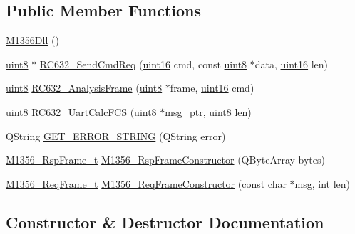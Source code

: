 \subsection*{Public Member Functions}
\begin{DoxyCompactItemize}
\item 
\mbox{\hyperlink{class_m1356_dll_a38686d41a3476f15cf676795806aff7d}{M1356\+Dll}} ()
\item 
\mbox{\hyperlink{m1356dll_8h_adde6aaee8457bee49c2a92621fe22b79}{uint8}} $\ast$ \mbox{\hyperlink{class_m1356_dll_ab86ae59233d587f4688470796cbb85b1}{R\+C632\+\_\+\+Send\+Cmd\+Req}} (\mbox{\hyperlink{m1356dll_8h_a05f6b0ae8f6a6e135b0e290c25fe0e4e}{uint16}} cmd, const \mbox{\hyperlink{m1356dll_8h_adde6aaee8457bee49c2a92621fe22b79}{uint8}} $\ast$data, \mbox{\hyperlink{m1356dll_8h_a05f6b0ae8f6a6e135b0e290c25fe0e4e}{uint16}} len)
\item 
\mbox{\hyperlink{m1356dll_8h_adde6aaee8457bee49c2a92621fe22b79}{uint8}} \mbox{\hyperlink{class_m1356_dll_a40aed3801baa294bf828c5ab794ef82e}{R\+C632\+\_\+\+Analysis\+Frame}} (\mbox{\hyperlink{m1356dll_8h_adde6aaee8457bee49c2a92621fe22b79}{uint8}} $\ast$frame, \mbox{\hyperlink{m1356dll_8h_a05f6b0ae8f6a6e135b0e290c25fe0e4e}{uint16}} cmd)
\item 
\mbox{\hyperlink{m1356dll_8h_adde6aaee8457bee49c2a92621fe22b79}{uint8}} \mbox{\hyperlink{class_m1356_dll_a048d48e3154a48258d25391b19de938c}{R\+C632\+\_\+\+Uart\+Calc\+F\+CS}} (\mbox{\hyperlink{m1356dll_8h_adde6aaee8457bee49c2a92621fe22b79}{uint8}} $\ast$msg\+\_\+ptr, \mbox{\hyperlink{m1356dll_8h_adde6aaee8457bee49c2a92621fe22b79}{uint8}} len)
\item 
Q\+String \mbox{\hyperlink{class_m1356_dll_ad35a73433e99eb6ccce5f3729f7ae283}{G\+E\+T\+\_\+\+E\+R\+R\+O\+R\+\_\+\+S\+T\+R\+I\+NG}} (Q\+String error)
\item 
\mbox{\hyperlink{struct_m1356___rsp_frame__t}{M1356\+\_\+\+Rsp\+Frame\+\_\+t}} \mbox{\hyperlink{class_m1356_dll_a40131e8263bd201208a37ec1826d5310}{M1356\+\_\+\+Rsp\+Frame\+Constructor}} (Q\+Byte\+Array bytes)
\item 
\mbox{\hyperlink{struct_m1356___req_frame__t}{M1356\+\_\+\+Req\+Frame\+\_\+t}} \mbox{\hyperlink{class_m1356_dll_a44099cd5f4bbdf9f37507eb7fa5477d6}{M1356\+\_\+\+Req\+Frame\+Constructor}} (const char $\ast$msg, int len)
\end{DoxyCompactItemize}


\subsection{Constructor \& Destructor Documentation}
\mbox{\label{class_m1356_dll_a38686d41a3476f15cf676795806aff7d}} 
